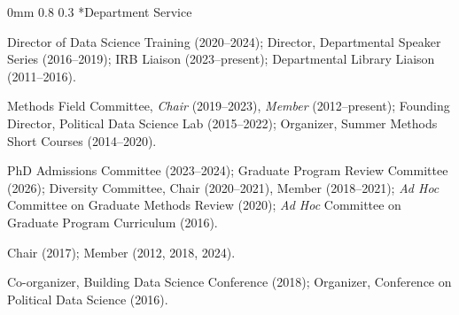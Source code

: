 \documentclass[10pt]{article}
\makeatletter
\renewcommand{\subsection}{\@startsection{subsection}{2}
{0mm}
{0.8\baselineskip}
{0.3\baselineskip}
{\normalsize\scshape}}
\newenvironment{CVwide}
  {\begin{list}{}
    {\renewcommand{\makelabel}{\entrylabel}
    \setlength{\labelwidth}{85pt}
    \setlength{\leftmargin}{92pt}
  }}
  {\end{list}}
\makeatother
\begin{document}
\subsection*{Department Service}
\begin{CVwide}
\item[\textbf{Leadership}] Director of Data Science Training (2020--2024); Director, Departmental Speaker Series (2016--2019); IRB Liaison (2023--present); Departmental Library Liaison (2011--2016).

\item[\textbf{Subfield}] Methods Field Committee, \textit{Chair} (2019--2023), \textit{Member} (2012--present); Founding Director, Political Data Science Lab (2015--2022); Organizer, Summer Methods Short Courses (2014--2020).

\item[\textbf{Advisory}] PhD Admissions Committee (2023--2024); Graduate Program Review Committee (2026); Diversity Committee, Chair (2020--2021), Member (2018--2021); \textit{Ad Hoc} Committee on Graduate Methods Review (2020); \textit{Ad Hoc} Committee on Graduate Program Curriculum (2016).

\item[\textbf{Searches}] Chair (2017); Member (2012, 2018, 2024).

\item[\textbf{Conferences}] Co-organizer, Building Data Science Conference (2018); Organizer, Conference on Political Data Science (2016).
\end{CVwide}




\end{document}
